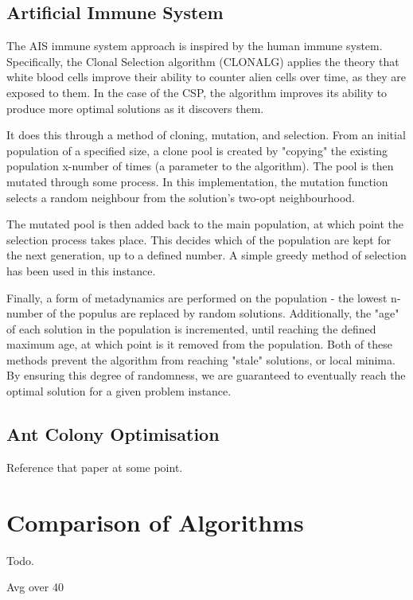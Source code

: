 \documentclass{article}
\begin{document}
  \subsection{Artificial Immune System}

  The AIS immune system approach is inspired by the human immune system. Specifically, the Clonal Selection algorithm (CLONALG) applies the theory that white blood cells improve their ability to counter alien cells over time, as they are exposed to them. In the case of the CSP, the algorithm improves its ability to produce more optimal solutions as it discovers them.

  It does this through a method of cloning, mutation, and selection. From an initial population of a specified size, a clone pool is created by "copying" the existing population x-number of times (a parameter to the algorithm). The pool is then mutated through some process. In this implementation, the mutation function selects a random neighbour from the solution's two-opt neighbourhood.

  The mutated pool is then added back to the main population, at which point the selection process takes place. This decides which of the population are kept for the next generation, up to a defined number. A simple greedy method of selection has been used in this instance.

  Finally, a form of metadynamics are performed on the population - the lowest n-number of the populus are replaced by random solutions. Additionally, the "age" of each solution in the population is incremented, until reaching the defined maximum age, at which point is it removed from the population. Both of these methods prevent the algorithm from reaching "stale" solutions, or local minima. By ensuring this degree of randomness, we are guaranteed to eventually reach the optimal solution for a given problem instance.

  \subsection{Ant Colony Optimisation}

    Reference that paper\cite{acoforcsp} at some point.

\section{Comparison of Algorithms}

  Todo.

  Avg over 40
\end{document}
